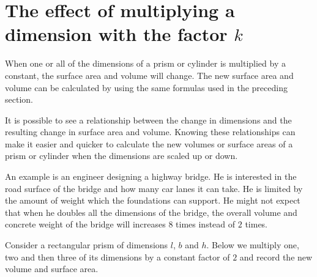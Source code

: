 \section{The effect of multiplying a dimension with the factor $k$}
When one or all of the dimensions of a prism or cylinder is multiplied by a constant, the
surface area and volume will change. The new surface area and volume can be calculated by
using the same formulas used in the preceding section.\par
It is possible to see a relationship between the change in dimensions and the resulting change
in surface area and volume. Knowing these relationships can make it easier and quicker to
calculate the new volumes or surface areas of a prism or cylinder when the dimensions are
scaled up or down.\par
An example is an engineer designing a highway bridge. He is interested in the road surface of
the bridge and how many car lanes it can take. He is limited by the amount of weight which
the foundations can support. He might not expect that when he doubles all the dimensions of
the bridge, the overall volume and concrete weight of the bridge will increases $8$ times
instead of $2$ times.\par
Consider a rectangular prism of dimensions $l$, $b$ and $h$. Below we multiply one, two and then
three of its dimensions by a constant factor of $2$ and record the new volume and surface area.\par
